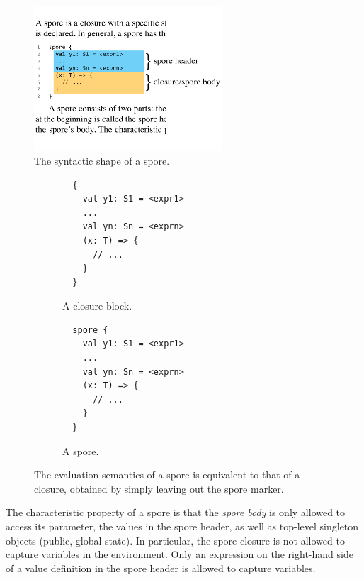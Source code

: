 \documentclass{llncs}
\begin{document}
\begin{figure}[t!]
\centering
\includegraphics[width=7cm]{spore-shape.pdf}
\vspace{-0.4cm}
\caption{The syntactic shape of a spore.}
\label{fig:spore-shape}
\end{figure}

\begin{figure}%
\begin{subfigure}{.5\textwidth}
  \centering
  \begin{lstlisting}
  {
    val y1: S1 = <expr1>
    ...
    val yn: Sn = <exprn>
    (x: T) => {
      // ...
    }
  }
  \end{lstlisting}
  \caption{A closure block.}
  \label{fig:normal-block}
\end{subfigure}%
\begin{subfigure}{.5\textwidth}
  \centering
  \begin{lstlisting}
  spore {
    val y1: S1 = <expr1>
    ...
    val yn: Sn = <exprn>
    (x: T) => {
      // ...
    }
  }
  \end{lstlisting}
  \caption{A spore.}
  \label{fig:normal-spore-shape}
\end{subfigure}%
\vspace{1mm}
\caption{The evaluation semantics of a spore is equivalent to that of a closure, obtained by simply leaving out the spore marker.}
\label{fig:evaluation-semantics}
\end{figure}


\vspace{-1.5mm}
The characteristic property
of a spore is that the {\em spore body} is only allowed to access its
parameter, the values in the spore header, as well as top-level singleton objects
(public, global state). In particular, the spore closure is not allowed to
capture variables in the environment. Only an expression on the right-hand
side of a value definition in the spore header is allowed to capture
variables.
\end{document}
